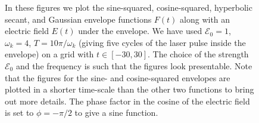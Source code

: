 \begin{figure}
                \caption{In these figures we plot the sine-squared,
                cosine-squared, hyperbolic secant, and Gaussian envelope
                functions $F(t)$ along with an electric field $E(t)$ under the
                envelope.
                We have used $\mathcal{E}_0 = 1$, $\omega_k = 4$, $T =
                10\pi/\omega_k$ (giving five cycles of the laser pulse inside
                the envelope) on a grid with $t \in [-30, 30]$.
                The choice of the strength $\mathcal{E}_0$ and the frequency is
                such that the figures look presentable.
                Note that the figures for the sine- and cosine-squared envelopes
                are plotted in a shorter time-scale than the other two functions
                to bring out more details.
                The phase factor in the cosine of the electric field is set to
                $\phi = -\pi/2$ to give a sine function.}
                \label{fig:envelope-functions}
            \end{figure}

